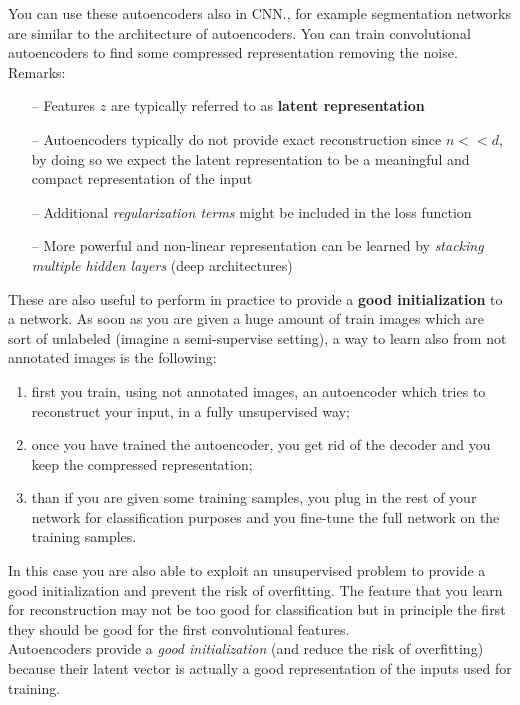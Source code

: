 You can use these autoencoders also in CNN., for example segmentation networks are similar to the architecture of autoencoders. You can train convolutional autoencoders to find some compressed representation removing the noise. \\

Remarks:
\begin{itemize}
    \item[--] Features $z$ are typically referred to as \textbf{latent representation}
    \item[--] Autoencoders typically do not provide exact reconstruction since $n << d$, by doing so we expect the latent representation to be a meaningful and compact representation of the input
    \item[--] Additional \textit{regularization terms} might be included in the loss function
    \item[--] More powerful and non-linear representation can be learned by \textit{stacking multiple hidden layers} (deep architectures)
\end{itemize}{}

These are also useful to perform in practice to provide a \textbf{good initialization} to a network. As soon as you are given a huge amount of train images which are sort of unlabeled (imagine a semi-supervise setting), a way to learn also from not annotated images is the following:
\begin{enumerate}
    \item first you train, using not annotated images, an autoencoder which tries to reconstruct your input, in a fully unsupervised way;
    \item once you have trained the autoencoder, you get rid of the decoder and you keep the compressed representation;
    \item than if you are given some training samples, you plug in the rest of your network for classification purposes and you fine-tune the full network on the training samples. 
\end{enumerate}
In this case you are also able to exploit an unsupervised problem to provide a good initialization and prevent the risk of overfitting. The feature that you learn for reconstruction may not be too good for classification but in principle the first they should be good for the first convolutional features.\\

Autoencoders provide a \textit{good initialization} (and reduce the risk of overfitting) because their latent vector is actually a good representation of the inputs used for training. 

